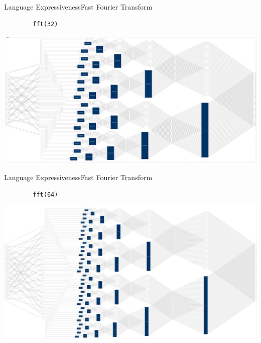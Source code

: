\begin{frame}[fragile,shrink=30]{Language Expressiveness}{Fast Fourier Transform}
    \vspace{1cm}
    \begin{lstlisting}
        fft(32)
    \end{lstlisting}

    \begin{center}
        \includegraphics[width=1\textwidth]{images/fft32}
    \end{center}
\end{frame}
    
\begin{frame}[fragile,shrink=30]{Language Expressiveness}{Fast Fourier Transform}
    \vspace{1cm}
    \begin{lstlisting}
        fft(64)
    \end{lstlisting}

    \begin{center}
        \includegraphics[width=1\textwidth]{images/fft64}
    \end{center}
\end{frame}


